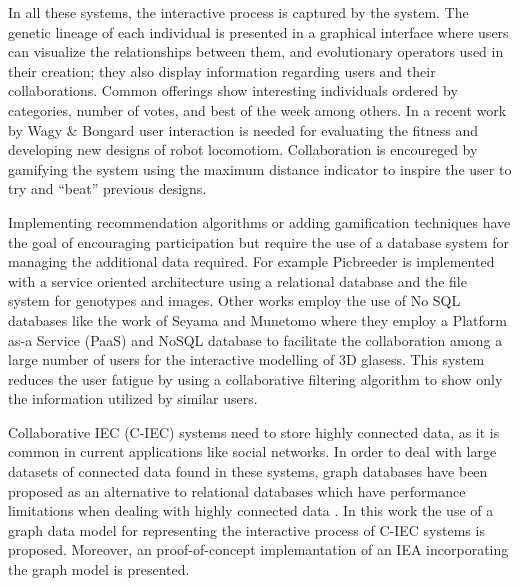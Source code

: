 \documentclass[conference]{IEEEtran}
\begin{document}
In all these systems, the interactive process is captured by the system. The genetic lineage of each
individual is presented in a graphical interface 
where users can visualize the relationships between them, and evolutionary operators used in
their creation; they also display information regarding users and their collaborations.  Common offerings show 
interesting individuals ordered by categories, number of votes, and best of the week among others. In a recent work by
Wagy \& Bongard \cite{wagy2014collective} user interaction is needed for evaluating the fitness and developing
new designs of robot locomotiom. Collaboration is encoureged by gamifying the system 
using the maximum distance indicator to inspire the user to try and “beat” previous designs. 

Implementing recommendation algorithms or adding gamification techniques have the goal of encouraging participation 
but require the use of a database system for managing the additional data required. 
For example Picbreeder \cite{picbreeder} is implemented with a service oriented
architecture using a relational database and the file system for genotypes and images. Other works employ the 
use of No SQL databases like the work of Seyama and Munetomo \cite{seyama2016development} where they
employ a Platform as-a Service (PaaS) and NoSQL database to facilitate the collaboration 
among a large number of users for the interactive modelling of 3D glasess.  This system reduces the user fatigue
by using a collaborative filtering algorithm to show only the information utilized by similar users.


Collaborative IEC (C-IEC) systems need to store highly connected data, as it is common in current applications
like social networks. In order to deal with large datasets of connected data found in these systems,
graph databases \cite{angles2012comparison} have been proposed as an alternative to relational databases 
which have performance limitations when dealing with highly connected data \cite{holzschuher2013performance}.
In this work the use of a graph data model for representing the interactive process of C-IEC systems is proposed.
Moreover, an proof-of-concept implemantation of an IEA incorporating the graph model is presented.

\end{document}

